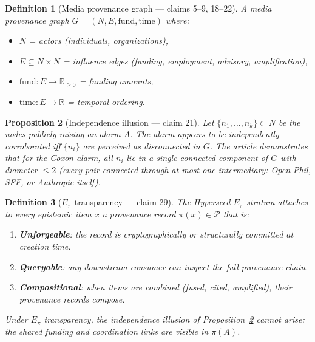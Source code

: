 \documentclass[11pt,a4paper]{article}
\newtheorem{definition}{Definition}[section]
\newtheorem{proposition}[definition]{Proposition}
\begin{document}
\begin{definition}[Media provenance graph --- claims 5--9, 18--22]
\label{def:prov-graph}
A \emph{media provenance graph} $G = (N, E, \text{fund}, \text{time})$ where:
\begin{itemize}
\item $N$ = actors (individuals, organizations),
\item $E \subseteq N \times N$ = influence edges (funding, employment,
  advisory, amplification),
\item $\text{fund} : E \to \mathbb{R}_{\geq 0}$ = funding amounts,
\item $\text{time} : E \to \mathbb{R}$ = temporal ordering.
\end{itemize}
\end{definition}

\begin{proposition}[Independence illusion --- claim 21]
\label{prop:independence}
Let $\{n_1, \ldots, n_k\} \subset N$ be the nodes publicly raising
an alarm $A$. The alarm appears to be independently corroborated iff
$\{n_i\}$ are perceived as disconnected in $G$. The article demonstrates
that for the Coxon alarm, all $n_i$ lie in a single connected component
of $G$ with diameter $\leq 2$ (every pair connected through at most one
intermediary: Open Phil, SFF, or Anthropic itself).
\end{proposition}

\begin{definition}[$E_\pi$ transparency --- claim 29]
\label{def:epi-transparency}
The Hyperseed $E_\pi$ stratum attaches to every epistemic item $x$ a
provenance record $\pi(x) \in \mathcal{P}$ that is:
\begin{enumerate}
\item \textbf{Unforgeable}: the record is cryptographically or
  structurally committed at creation time.
\item \textbf{Queryable}: any downstream consumer can inspect the
  full provenance chain.
\item \textbf{Compositional}: when items are combined (fused, cited,
  amplified), their provenance records compose.
\end{enumerate}
Under $E_\pi$ transparency, the independence illusion of
Proposition~\ref{prop:independence} cannot arise: the shared funding
and coordination links are visible in $\pi(A)$.
\end{definition}

\end{document}
